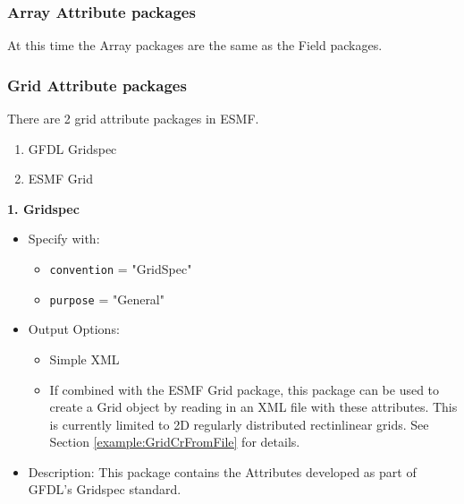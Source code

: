 \vspace{.20in}

\subsubsection{Array Attribute packages}
\label{ArrayAttributePackages}

At this time the Array packages are the same as the Field packages.

\vspace{.20in}

\subsubsection{Grid Attribute packages}
\label{GridAttributePackages}

There are 2 grid attribute packages in ESMF. 

\begin{enumerate}
    \item GFDL Gridspec
    \item ESMF Grid
\end{enumerate}

\vspace{.20in}

{\bf 1. Gridspec}

\label{CIMGridAttributePackage}

\begin{itemize}
    \item Specify with:
    \begin{itemize}
        \item {\tt convention} = "GridSpec"
        \item {\tt purpose} = "General"
    \end{itemize}
    \item Output Options:
    \begin{itemize}
        \item Simple XML
        \item If combined with the ESMF Grid package, this package can be used to create a Grid object by reading in an XML file with these attributes. This is currently limited to 2D regularly distributed rectinlinear grids. See Section \ref{example:GridCrFromFile} for details. 
    \end{itemize}
    \item Description: This package contains the Attributes developed as part of GFDL's Gridspec standard.
\end{itemize}


